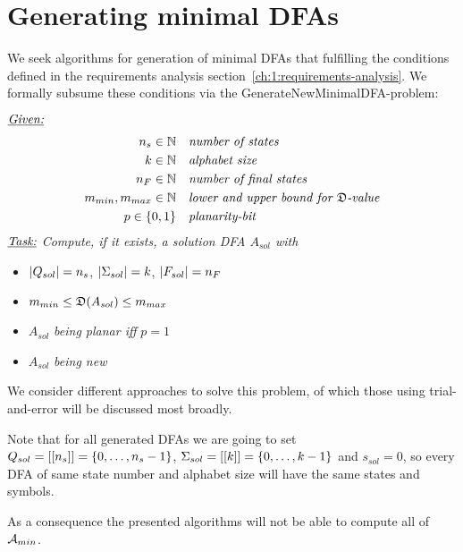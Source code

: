 
\chapter{Generating minimal DFAs} \label{ch:3}

We seek algorithms for generation of minimal DFAs that fulfilling the conditions defined in the requirements analysis section~\ref{ch:1:requirements-analysis}. We formally subsume these conditions via the GenerateNewMinimalDFA-problem:
\begin{definition}[GenerateNewMinimalDFA] $ $ \\
	$ $ \vspace{-0.4cm} \\
	\noindent $\underline{\emph{Given:}}$
	\vspace{-0.5cm}
	\begin{align*}
	{n_s} \in \mathbb{N}\ \ \ & \emph{number of states} \\
	k \in \mathbb{N}\ \ \ & \emph{alphabet size} \\
	{n_F} \in \mathbb{N}\ \ \ & \emph{number of final states} \\
	m_{min}, m_{max} \in \mathbb{N}\ \ \ & \emph{lower and upper bound for $\mathfrak{D}$-value} \\
	p \in \{0,1\}\ \ \ & \emph{planarity-bit}
	\end{align*}
	\noindent $\underline{\emph{Task:}}$ \emph{Compute, if it exists, a solution DFA $A_{sol}$ with}
	\begin{itemize}
		\item $|Q_{sol}|={n_s}$, $|\Sigma_{sol}|=k$, $|F_{sol}|={n_F}$
		\item $m_{min} \le \mathfrak{D}(A_{sol}) \le m_{max}$
		\item $A_{sol}$ \emph{being planar iff} $p = 1$
		\item $A_{sol}$ \emph{being new}
	\end{itemize}
\end{definition}
\noindent We consider different approaches to solve this problem, of which those using trial-and-error will be discussed most broadly.

\begin{remark}\label{ch:2:rem:qas-set}
	Note that for all generated DFAs we are going to set $Q_{sol} = [[{n_s}]] = \{0,\ldots,{n_s}-1\}$, $\Sigma_{sol} = [[k]] = \{0,\ldots,k-1\}$ and $s_{sol} = 0$, so every DFA of same state number and alphabet size will have the same states and symbols.
\end{remark}
\noindent As a consequence the presented algorithms will not be able to compute all of ${\mathcal{A}_{min}}$.

